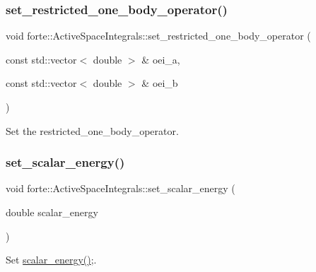 \subsubsection{\texorpdfstring{set\+\_\+restricted\+\_\+one\+\_\+body\+\_\+operator()}{set\_restricted\_one\_body\_operator()}}
{\footnotesize\ttfamily void forte\+::\+Active\+Space\+Integrals\+::set\+\_\+restricted\+\_\+one\+\_\+body\+\_\+operator (\begin{DoxyParamCaption}\item[{const std\+::vector$<$ double $>$ \&}]{oei\+\_\+a,  }\item[{const std\+::vector$<$ double $>$ \&}]{oei\+\_\+b }\end{DoxyParamCaption})\hspace{0.3cm}{\ttfamily [inline]}}



Set the restricted\+\_\+one\+\_\+body\+\_\+operator. 

\mbox{\label{classforte_1_1_active_space_integrals_a456ae6c8d7df86829519b265b728ff49}} 
\subsubsection{\texorpdfstring{set\+\_\+scalar\+\_\+energy()}{set\_scalar\_energy()}}
{\footnotesize\ttfamily void forte\+::\+Active\+Space\+Integrals\+::set\+\_\+scalar\+\_\+energy (\begin{DoxyParamCaption}\item[{double}]{scalar\+\_\+energy }\end{DoxyParamCaption})\hspace{0.3cm}{\ttfamily [inline]}}



Set \mbox{\hyperlink{classforte_1_1_active_space_integrals_ad75d3daa2e4a1d78b4dc0ffb5f60c80e}{scalar\+\_\+energy()}};. 

\mbox{\label{classforte_1_1_active_space_integrals_ae371fb9c622fd81006f20ed257853527}} 
